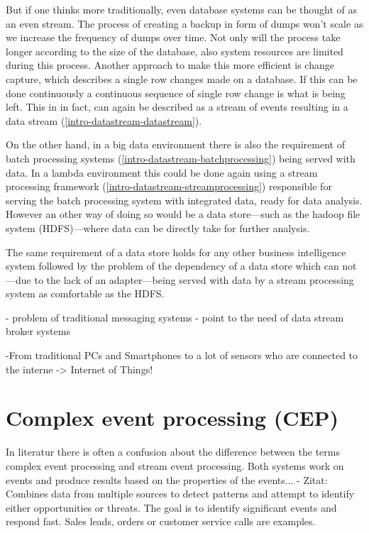 But if one thinks more traditionally, even database systems can be thought of as
an even stream. The process of creating a backup in form of dumps won't scale as
we increase the frequency of dumps over time. Not only will the process take
longer according to the size of the database, also system resources are limited
during this process. Another approach to make this more efficient is change
capture, which describes a single row changes made on a database. If this can be
done continuously a continuous sequence of single row change is what is being
left. This in in fact, can again be described as a stream of events resulting in a
data stream (\ref{intro-datastream-datastream}).

On the other hand, in a big data environment there is also the requirement of
batch processing systems (\ref{intro-datastream-batchprocessing}) being served
with data. In a lambda environment this could be done again using a stream
processing framework (\ref{intro-datastream-streamprocessing}) responsible for
serving the batch processing system with integrated data, ready for data
analysis. However an other way of doing so would be a data store---such as the
hadoop file system (HDFS)---where data can be directly take for further analysis.

The same requirement of a data store holds for any other business intelligence
system followed by the problem of the dependency of a data store which can
not---due to the lack of an adapter---being served with data by a stream processing 
system as comfortable as the HDFS.

- problem of traditional messaging systems
- point to the need of data stream broker systems


-From traditional PCs and Smartphones to a lot of sensors who are connected to
the interne -> Internet of Things!


\section{Complex event processing (CEP)}
In literatur there is often a confusion about the difference between the terms
complex event processing and stream event processing. Both systems work on
events and produce results based on the properties of the events... 
- Zitat: Combines data from multiple sources  to detect patterns and attempt to
identify either opportunities or threats. The goal is to identify significant
events and respond fast. Sales leads, orders or customer service calls are
examples.\\


